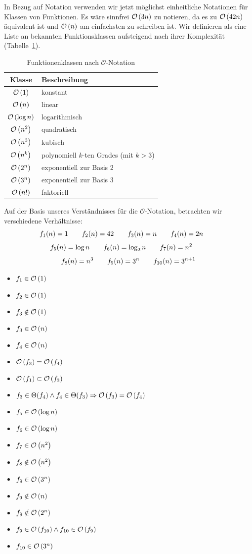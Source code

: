 In Bezug auf Notation verwenden wir jetzt möglichst einheitliche Notationen für Klassen von Funktionen. Es wäre sinnfrei $\mathcal{O}\left(3n\right)$ zu notieren, da es zu $\mathcal{O}\left(42n\right)$ äquivalent ist und $\mathcal{O}\left(n\right)$ am einfachsten zu schreiben ist. Wir definieren als eine Liste an bekannten Funktionsklassen aufsteigend nach ihrer Komplexität (Tabelle~\ref{tab:classes}).
\begin{table}[h]
 \begin{center}
  \begin{tabular}{cl}
   Klasse & Beschreibung \\
  \hline
   $\mathcal{O}\left(1\right)$ & konstant \\
   $\mathcal{O}\left(n\right)$ & linear \\
   $\mathcal{O}\left(\log{n}\right)$ & logarithmisch \\
   $\mathcal{O}\left(n^2\right)$ & quadratisch \\
   $\mathcal{O}\left(n^3\right)$ & kubisch \\
   $\mathcal{O}\left(n^k\right)$ & polynomiell $k$-ten Grades (mit $k>3$) \\
   $\mathcal{O}\left(2^n\right)$ & exponentiell zur Basis 2 \\
   $\mathcal{O}\left(3^n\right)$ & exponentiell zur Basis 3 \\
   $\mathcal{O}\left(n!\right)$ & faktoriell \\
  \end{tabular}
  \caption{Funktionenklassen nach $\mathcal{O}$-Notation}
  \label{tab:classes}
 \end{center}
\end{table}

Auf der Basis unseres Verständnisses für die $\mathcal{O}$-Notation, betrachten wir verschiedene Verhältnisse:%
\[
   f_1(n) = 1 \hspace{20pt}
   f_2(n) = 42 \hspace{20pt}
   f_3(n) = n \hspace{20pt}
   f_4(n) = 2n \hspace{20pt}
\] \[
   f_5(n) = \log{n} \hspace{20pt}
   f_6(n) = \log_2{n} \hspace{20pt}
   f_7(n) = n^2 \hspace{20pt}
\] \[
   f_8(n) = n^3 \hspace{20pt}
   f_9(n) = 3^n \hspace{20pt}
   f_{10}(n) = 3^{n+1}
\]
\begin{itemize}
  \item $f_1 \in \mathcal{O}\left(1\right)$
  \item $f_2 \in \mathcal{O}\left(1\right)$
  \item $f_3 \notin \mathcal{O}\left(1\right)$
  \item $f_3 \in \mathcal{O}\left(n\right)$
  \item $f_4 \in \mathcal{O}\left(n\right)$
  \item $\mathcal{O}\left(f_3\right) = \mathcal{O}\left(f_4\right)$
  \item $\mathcal{O}\left(f_1\right) \subset \mathcal{O}\left(f_3\right)$
  \item $f_3 \in \Theta(f_4) \land f_4 \in \Theta(f_3) \Rightarrow \mathcal{O}\left(f_3\right) = \mathcal{O}\left(f_4\right)$
  \item $f_5 \in \mathcal{O}\left(\log{n}\right)$
  \item $f_6 \in \mathcal{O}\left(\log{n}\right)$
  \item $f_7 \in \mathcal{O}\left(n^2\right)$
  \item $f_8 \notin \mathcal{O}\left(n^2\right)$
  \item $f_9 \in \mathcal{O}\left(3^n\right)$
  \item $f_9 \notin \mathcal{O}\left(n\right)$
  \item $f_9 \notin \mathcal{O}\left(2^n\right)$
  \item $f_9 \in \mathcal{O}\left(f_{10}\right) \land f_{10} \in \mathcal{O}\left(f_9\right)$
  \item $f_{10} \in \mathcal{O}\left(3^n\right)$
\end{itemize}

